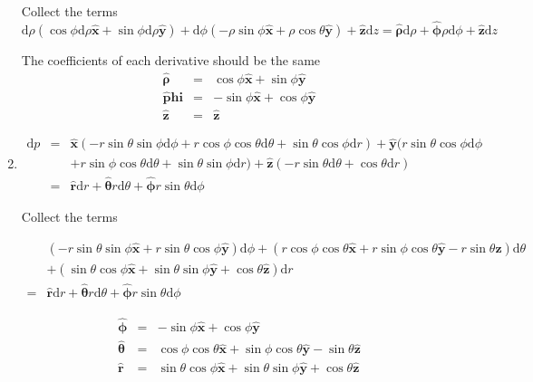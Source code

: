 \documentclass[12pt,a4paper]{article}
\begin{document}
\begin{enumerate}
Collect the terms
\begin{equation}
	\mathrm d\rho(\cos\phi\mathrm d \rho \bm{\hat x} + \sin\phi \mathrm d \rho \bm{\hat y}) + \mathrm d \phi(-\rho\sin\phi \bm{\hat x} + \rho\cos\theta \bm{\hat y}) + \bm{\hat z}\mathrm dz
	= \bm{\hat \rho} \mathrm d\rho + \bm{\hat \phi} \rho \mathrm d \phi + \bm{\hat z} \mathrm dz
\end{equation}

The coefficients of each derivative should be the same
\begin{eqnarray*}
	\bm {\hat \rho} &=& \cos\phi \bm {\hat x} + \sin\phi \bm{\hat y} \\
	\bm {\hat phi} &=& -\sin\phi\bm{\hat x} + \cos\phi \bm{\hat y} \\
	\bm {\hat z} &=& \bm {\hat z}
\end{eqnarray*}




\item
\begin{eqnarray*}
	\mathrm dp &=& \bm{\hat x} (-r\sin\theta\sin\phi\mathrm d \phi + r\cos\phi\cos\theta \mathrm d\theta + \sin\theta\cos\phi \mathrm dr) + \bm{\hat y} (r\sin\theta\cos\phi \mathrm d \phi \\
	&&+ r \sin\phi\cos\theta\mathrm d\theta + \sin\theta\sin\phi \mathrm dr) + \bm{\hat z} (-r\sin\theta\mathrm d\theta + \cos\theta\mathrm dr) \\
	&=& \bm {\hat r} \mathrm dr + \bm{\hat\theta}r \mathrm d\theta + \bm{\hat \phi} r\sin\theta \mathrm d\phi
\end{eqnarray*}

Collect the terms

\begin{equation*}
\begin{split}
&	(-r\sin\theta\sin\phi\bm{\hat x} + r\sin\theta\cos\phi \bm{\hat y})  \mathrm d\phi + (r\cos\phi\cos\theta\bm{\hat x} + r\sin\phi\cos\theta \bm{\hat y} - r\sin\theta \bm{\hat z})\mathrm d\theta  \\
& + ( \sin\theta\cos\phi \bm{\hat x} + \sin\theta\sin\phi \bm{\hat y} + \cos\theta \bm{\hat z} )\mathrm dr   \\
	=& \bm {\hat r} \mathrm dr + \bm{\hat\theta}r \mathrm d\theta + \bm{\hat \phi} r\sin\theta \mathrm d\phi
\end{split}
\end{equation*}



\begin{eqnarray*}
	\bm{\hat \phi}&=&-\sin\phi\bm{\hat x} + \cos\phi \bm{\hat y} \\
	\bm{\hat \theta}&=&\cos\phi\cos\theta\bm{\hat x} + \sin\phi\cos\theta \bm{\hat y} - \sin\theta \bm{\hat z} \\
	\bm{\hat r} &=&  \sin\theta\cos\phi \bm{\hat x} + \sin\theta\sin\phi \bm{\hat y} + \cos\theta \bm{\hat z} 
\end{eqnarray*}








\end{enumerate}
\end{document}
